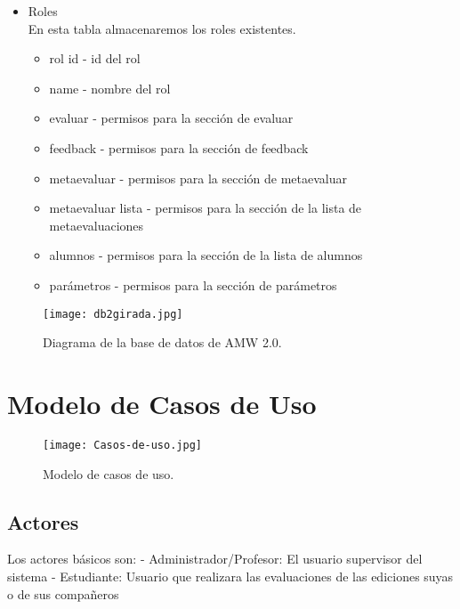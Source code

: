 \begin{itemize}
	\item Roles\\
	
	En esta tabla almacenaremos los roles existentes.
	
	\begin{itemize}
		\item rol id - id del rol
		\item name - nombre del rol
		\item evaluar - permisos para la sección de evaluar
		\item feedback - permisos para la sección de feedback
		\item metaevaluar - permisos para la sección de metaevaluar
		\item metaevaluar lista - permisos para la sección de la lista de metaevaluaciones
		\item alumnos - permisos para la sección de la lista de alumnos
		\item parámetros - permisos para la sección de parámetros
	\end{itemize}
	
\end{itemize}

\begin{figure}[h]
	\centering
	\texttt{[image: db2girada.jpg]}
	\caption{Diagrama de la base de datos de AMW 2.0.}
\end{figure}

\clearpage

\section{Modelo de Casos de Uso}

\begin{figure}
	\centering
	\texttt{[image: Casos-de-uso.jpg]}
	\caption{Modelo de casos de uso.}
\end{figure}

\subsection{Actores} 
Los actores básicos son:
\newline
- Administrador/Profesor: El usuario supervisor del sistema
\newline
- Estudiante: Usuario que realizara las evaluaciones de las ediciones suyas o de sus compañeros
\newline

